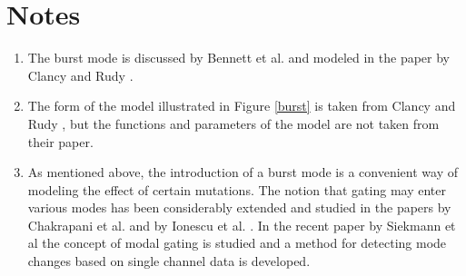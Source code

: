 \clearpage

\section{Notes \label{notesburst}}

\begin{enumerate}
\item The burst mode is discussed by Bennett et al. \cite{Bennett1995} and modeled
in the paper by Clancy and Rudy \cite{Clancy1999}.
\item The form of the model illustrated in Figure \ref{burst} is taken from Clancy and
Rudy \cite{Clancy1999}, but the functions and parameters of the model are not
taken from their paper.
\item As mentioned above, the introduction of a burst mode is a convenient way of modeling the effect of certain mutations. The notion that gating may enter various modes has been considerably extended and studied in the papers by Chakrapani et al. \cite{ Chakrapani2007a, Chakrapani2007b, Chakrapani2011} and by Ionescu et al. \cite{Ionescu2007}. In the recent paper by Siekmann et al \cite{Siekmann2014} the concept of modal gating is studied and a method for detecting mode changes based on single channel data is developed.
\end{enumerate}
